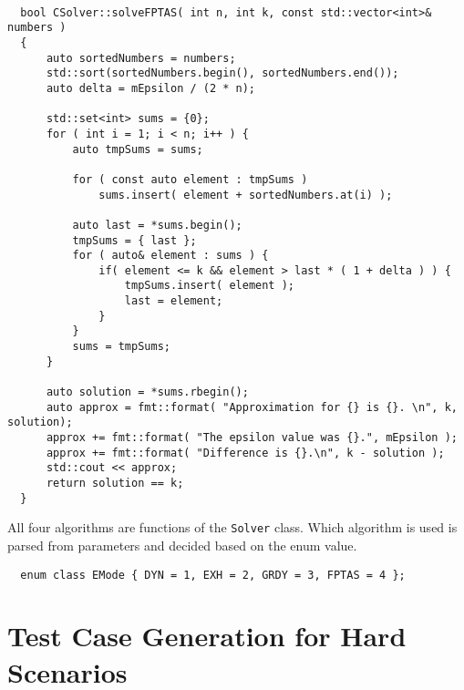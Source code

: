 \documentclass[11pt]{article}
\begin{document}
\begin{verbatim}

  bool CSolver::solveFPTAS( int n, int k, const std::vector<int>& numbers )
  {
      auto sortedNumbers = numbers;
      std::sort(sortedNumbers.begin(), sortedNumbers.end());
      auto delta = mEpsilon / (2 * n);
  
      std::set<int> sums = {0};
      for ( int i = 1; i < n; i++ ) {
          auto tmpSums = sums;
  
          for ( const auto element : tmpSums ) 
              sums.insert( element + sortedNumbers.at(i) );
  
          auto last = *sums.begin();
          tmpSums = { last };
          for ( auto& element : sums ) {
              if( element <= k && element > last * ( 1 + delta ) ) {
                  tmpSums.insert( element );
                  last = element;
              }
          }
          sums = tmpSums;
      }
  
      auto solution = *sums.rbegin();
      auto approx = fmt::format( "Approximation for {} is {}. \n", k, solution);
      approx += fmt::format( "The epsilon value was {}.", mEpsilon );
      approx += fmt::format( "Difference is {}.\n", k - solution );
      std::cout << approx;
      return solution == k;
  }  
\end{verbatim}

All four algorithms are functions of the \texttt{Solver} class. Which algorithm is used is parsed from parameters and decided based on the enum value.

\begin{verbatim}
  enum class EMode { DYN = 1, EXH = 2, GRDY = 3, FPTAS = 4 };
\end{verbatim}

\section{Test Case Generation for Hard Scenarios}
\end{document}
